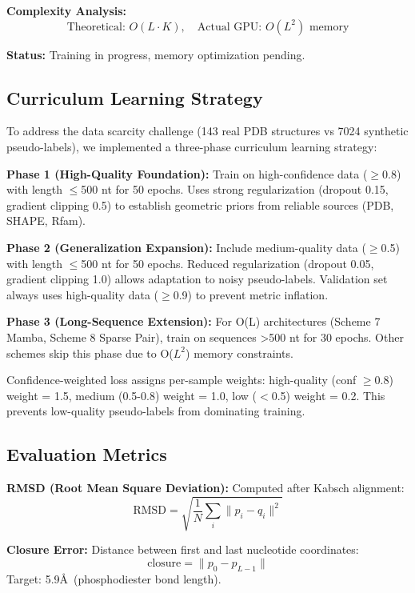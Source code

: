 \documentclass[12pt]{article}
\begin{document}
\textbf{Complexity Analysis:}
\begin{equation}
\text{Theoretical: } O(L \cdot K), \quad \text{Actual GPU: } O(L^2) \text{ memory}
\end{equation}

\textbf{Status:} Training in progress, memory optimization pending.

\subsection{Curriculum Learning Strategy}

To address the data scarcity challenge (143 real PDB structures vs 7024 synthetic pseudo-labels), we implemented a three-phase curriculum learning strategy:

\textbf{Phase 1 (High-Quality Foundation):} Train on high-confidence data ($\geq$0.8) with length $\leq$500 nt for 50 epochs. Uses strong regularization (dropout 0.15, gradient clipping 0.5) to establish geometric priors from reliable sources (PDB, SHAPE, Rfam).

\textbf{Phase 2 (Generalization Expansion):} Include medium-quality data ($\geq$0.5) with length $\leq$500 nt for 50 epochs. Reduced regularization (dropout 0.05, gradient clipping 1.0) allows adaptation to noisy pseudo-labels. Validation set always uses high-quality data ($\geq$0.9) to prevent metric inflation.

\textbf{Phase 3 (Long-Sequence Extension):} For O(L) architectures (Scheme 7 Mamba, Scheme 8 Sparse Pair), train on sequences >500 nt for 30 epochs. Other schemes skip this phase due to O($L^2$) memory constraints.

Confidence-weighted loss assigns per-sample weights: high-quality (conf $\geq$0.8) weight = 1.5, medium (0.5-0.8) weight = 1.0, low ($<$0.5) weight = 0.2. This prevents low-quality pseudo-labels from dominating training.

\subsection{Evaluation Metrics}

\textbf{RMSD (Root Mean Square Deviation):} Computed after Kabsch alignment:
\begin{equation}
\text{RMSD} = \sqrt{\frac{1}{N} \sum_{i} \|p_i - q_i\|^2}
\end{equation}

\textbf{Closure Error:} Distance between first and last nucleotide coordinates:
\begin{equation}
\text{closure} = \|p_0 - p_{L-1}\|
\end{equation}
Target: 5.9\AA\ (phosphodiester bond length).
\end{document}
